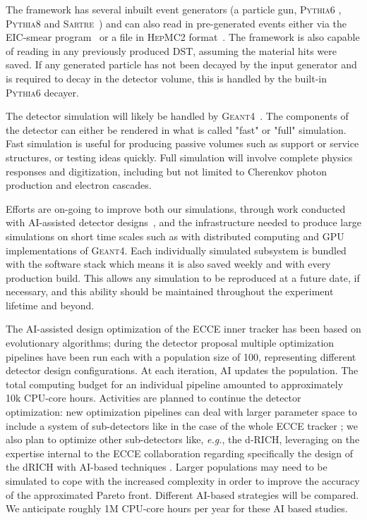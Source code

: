 	The framework has several inbuilt event generators (a particle gun, \textsc{Pythia6} \cite{Sjostrand:2000wi}, \textsc{Pythia8} \cite{Sjostrand:2007gs} and \textsc{Sartre}~\cite{Toll:2013gda}) and can also read in pre-generated events either via the EIC-smear program~\cite{eicsmear} or a file in \textsc{HepMC2} format~\cite{Dobbs:2001ck}. The framework is also capable of reading in any previously produced DST, assuming the material hits were saved. If any generated particle has not been decayed by the input generator and is required to decay in the detector volume, this is handled by the built-in \textsc{Pythia6} decayer. 
	
	The detector simulation will likely be handled by \textsc{Geant4}~\cite{Agostinelli:2002hh}. The components of the detector can either be rendered in what is called "fast" or "full" simulation. Fast simulation is useful for producing passive volumes such as support or service structures, or testing ideas quickly. Full simulation will involve complete physics responses and digitization, including but not limited to Cherenkov photon production and electron cascades. 
	
	Efforts are on-going to improve both our simulations, through work conducted with AI-assisted detector designs~\cite{ecce-note-comp-2021-03}, and the infrastructure needed to produce large simulations on short time scales such as with distributed computing and GPU implementations of \textsc{Geant4}. Each individually simulated subsystem is bundled with the software stack which means it is also saved weekly and with every production build. This allows any simulation to be reproduced at a future date, if necessary, and this ability should be maintained throughout the experiment lifetime and beyond. 
	
    The AI-assisted design optimization of the ECCE inner tracker \cite{ecce-note-comp-2021-03} has been based on evolutionary algorithms; during the detector proposal multiple optimization pipelines have been run each with a population size of 100, representing different detector design configurations. At each iteration, AI updates the population. The total computing budget for an individual pipeline amounted to approximately 10k CPU-core hours. 
    Activities are planned to continue the detector optimization: new optimization pipelines can deal with larger parameter space to include a system of sub-detectors like in the case of the whole ECCE tracker  \cite{ecce-note-comp-2021-03}; we also plan to optimize other sub-detectors like, \textit{e.g.}, the d-RICH, leveraging on the expertise internal to the ECCE collaboration regarding specifically the design of the dRICH with AI-based techniques \cite{cisbani2020ai}. 
    Larger populations may need to be simulated to cope with the increased complexity in order to improve the accuracy of the approximated Pareto front. Different AI-based strategies will be compared. 
    We anticipate roughly 1M CPU-core hours per year for these AI based studies.


